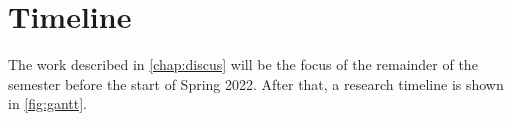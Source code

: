  
\chapter{Timeline}
\resetfootnote %

The work described in \ref{chap:discus} will be the focus of the remainder of the semester before the start of Spring 2022. After that, a research timeline is shown in \ref{fig:gantt}. 

